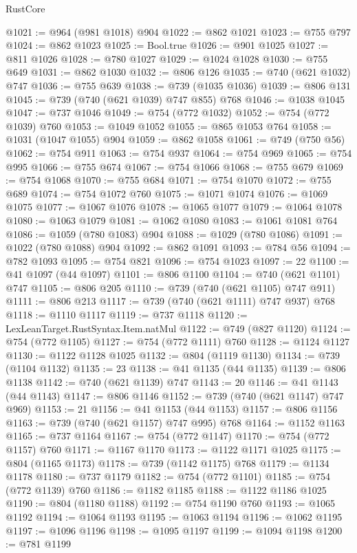 \begin{lexlean}{RustCore}
\begin{coremodule}
@1021 := @964 (@981 @1018) @904
@1022 := @862 @1021
@1023 := @755 @797
@1024 := @862 @1023
@1025 := Bool.true
@1026 := @901 @1025
@1027 := @811 @1026
@1028 := @780 @1027
@1029 := @1024 @1028
@1030 := @755 @649
@1031 := @862 @1030
@1032 := @806 @126
@1035 := @740 (@621 @1032) @747
@1036 := @755 @639
@1038 := @739 (@1035 @1036)
@1039 := @806 @131
@1045 := @739 (@740 (@621 @1039) @747 @855) @768
@1046 := @1038 @1045
@1047 := @737 @1046
@1049 := @754 (@772 @1032)
@1052 := @754 (@772 @1039) @760
@1053 := @1049 @1052
@1055 := @865 @1053 @764
@1058 := @1031 (@1047 @1055) @904
@1059 := @862 @1058
@1061 := @749 (@750 @56)
@1062 := @754 @911
@1063 := @754 @937
@1064 := @754 @969
@1065 := @754 @995
@1066 := @755 @674
@1067 := @754 @1066
@1068 := @755 @679
@1069 := @754 @1068
@1070 := @755 @684
@1071 := @754 @1070
@1072 := @755 @689
@1074 := @754 @1072 @760
@1075 := @1071 @1074
@1076 := @1069 @1075
@1077 := @1067 @1076
@1078 := @1065 @1077
@1079 := @1064 @1078
@1080 := @1063 @1079
@1081 := @1062 @1080
@1083 := @1061 @1081 @764
@1086 := @1059 (@780 @1083) @904
@1088 := @1029 (@780 @1086)
@1091 := @1022 (@780 @1088) @904
@1092 := @862 @1091
@1093 := @784 @56
@1094 := @782 @1093
@1095 := @754 @821
@1096 := @754 @1023
@1097 := 22
@1100 := @41 @1097 (@44 @1097)
@1101 := @806 @1100
@1104 := @740 (@621 @1101) @747
@1105 := @806 @205
@1110 := @739 (@740 (@621 @1105) @747 @911)
@1111 := @806 @213
@1117 := @739 (@740 (@621 @1111) @747 @937) @768
@1118 := @1110 @1117
@1119 := @737 @1118
@1120 := LexLeanTarget.RustSyntax.Item.natMul
@1122 := @749 (@827 @1120)
@1124 := @754 (@772 @1105)
@1127 := @754 (@772 @1111) @760
@1128 := @1124 @1127
@1130 := @1122 @1128 @1025
@1132 := @804 (@1119 @1130)
@1134 := @739 (@1104 @1132)
@1135 := 23
@1138 := @41 @1135 (@44 @1135)
@1139 := @806 @1138
@1142 := @740 (@621 @1139) @747
@1143 := 20
@1146 := @41 @1143 (@44 @1143)
@1147 := @806 @1146
@1152 := @739 (@740 (@621 @1147) @747 @969)
@1153 := 21
@1156 := @41 @1153 (@44 @1153)
@1157 := @806 @1156
@1163 := @739 (@740 (@621 @1157) @747 @995) @768
@1164 := @1152 @1163
@1165 := @737 @1164
@1167 := @754 (@772 @1147)
@1170 := @754 (@772 @1157) @760
@1171 := @1167 @1170
@1173 := @1122 @1171 @1025
@1175 := @804 (@1165 @1173)
@1178 := @739 (@1142 @1175) @768
@1179 := @1134 @1178
@1180 := @737 @1179
@1182 := @754 (@772 @1101)
@1185 := @754 (@772 @1139) @760
@1186 := @1182 @1185
@1188 := @1122 @1186 @1025
@1190 := @804 (@1180 @1188)
@1192 := @754 @1190 @760
@1193 := @1065 @1192
@1194 := @1064 @1193
@1195 := @1063 @1194
@1196 := @1062 @1195
@1197 := @1096 @1196
@1198 := @1095 @1197
@1199 := @1094 @1198
@1200 := @781 @1199

\end{coremodule}
\end{lexlean}
